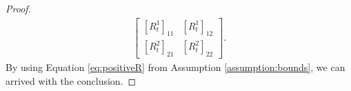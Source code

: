 \documentclass[letterpaper, 10 pt, conference]{ieeeconf}  %
\newcommand{\transpose}{\mathsf{T}}
\begin{document}
\begin{proof}
\begin{align*}
\begin{bmatrix}
            [R_{t}^{1}]_{11} & [R_{t}^{1}]_{12}\\
            [R_{t}^{2}]_{21} & [R_{t}^{2}]_{22}
        \end{bmatrix}.
    \end{align*}
    By using Equation \eqref{eq:positiveR} from Assumption \ref{assumption:bounds}, we can arrived with the conclusion.
\end{proof}
\end{document}
